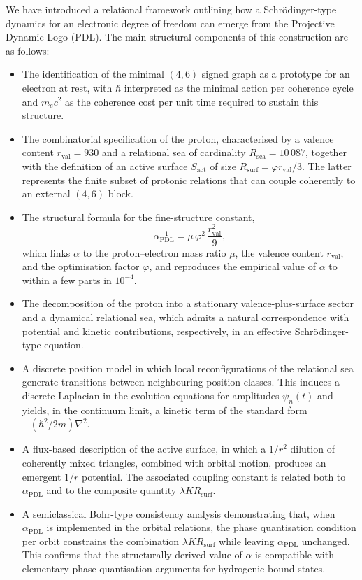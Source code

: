 \documentclass[11pt,a4paper]{article}
\begin{document}
We have introduced a relational framework outlining how a Schr\"odinger-type dynamics for an electronic degree of freedom can emerge from the Projective Dynamic Logo (PDL). The main structural components of this construction are as follows:
\begin{itemize}
\item The identification of the minimal $(4,6)$ signed graph as a prototype for an electron at rest, with $\hbar$ interpreted as the minimal action per coherence cycle and $m_e c^{2}$ as the coherence cost per unit time required to sustain this structure.\cite{Laubscher2026IntroPDL,Laubscher2026PDL_English}
\item The combinatorial specification of the proton, characterised by a valence content $r_{\mathrm{val}}=930$ and a relational sea of cardinality $R_{\mathrm{sea}}=10\,087$, together with the definition of an active surface $S_{\mathrm{act}}$ of size $R_{\mathrm{surf}}=\varphi r_{\mathrm{val}}/3$. The latter represents the finite subset of protonic relations that can couple coherently to an external $(4,6)$ block.\cite{Laubscher2026PDL_English,Laubscher2026LDP_French,Laubscher2026DerivationAlpha}
\item The structural formula for the fine-structure constant,
\begin{equation}
\alpha_{\mathrm{PDL}}^{-1} = \mu\,\varphi^{2}\,\frac{r_{\mathrm{val}}^{2}}{9},
\end{equation}
which links $\alpha$ to the proton–electron mass ratio $\mu$, the valence content $r_{\mathrm{val}}$, and the optimisation factor $\varphi$, and reproduces the empirical value of $\alpha$ to within a few parts in $10^{-4}$.\cite{Laubscher2026DerivationAlpha}
\item The decomposition of the proton into a stationary valence-plus-surface sector and a dynamical relational sea, which admits a natural correspondence with potential and kinetic contributions, respectively, in an effective Schr\"odinger-type equation.
\item A discrete position model in which local reconfigurations of the relational sea generate transitions between neighbouring position classes. This induces a discrete Laplacian in the evolution equations for amplitudes $\psi_n(t)$ and yields, in the continuum limit, a kinetic term of the standard form $-(\hbar^{2}/2m)\nabla^{2}$.
\item A flux-based description of the active surface, in which a $1/r^{2}$ dilution of coherently mixed triangles, combined with orbital motion, produces an emergent $1/r$ potential. The associated coupling constant is related both to $\alpha_{\mathrm{PDL}}$ and to the composite quantity $\lambda K R_{\mathrm{surf}}$.
\item A semiclassical Bohr-type consistency analysis demonstrating that, when $\alpha_{\mathrm{PDL}}$ is implemented in the orbital relations, the phase quantisation condition per orbit constrains the combination $\lambda K R_{\mathrm{surf}}$ while leaving $\alpha_{\mathrm{PDL}}$ unchanged. This confirms that the structurally derived value of $\alpha$ is compatible with elementary phase-quantisation arguments for hydrogenic bound states.
\end{itemize}
\end{document}
